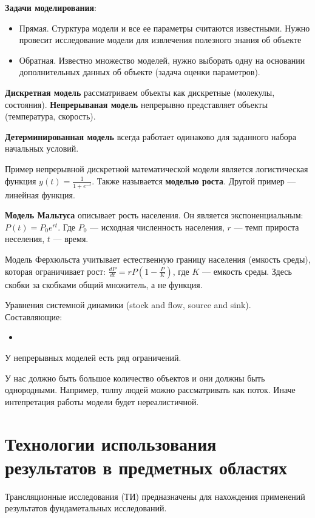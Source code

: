 \textbf{Задачи моделирования}:
\begin{itemize}
    \item Прямая. Стурктура модели и все ее параметры считаются известными.
        Нужно провесит исследование модели для извлечения полезного знания об
        объекте

    \item Обратная. Известно множество моделей, нужно выборать одну на
        основании дополнительных данных об объекте (задача оценки параметров).
\end{itemize}

\textbf{Дискретная модель} рассматриваем объекты как дискретные (молекулы, состояния).
\textbf{Непрерываная модель} непрерывно представляет объекты (температура, скорость).

\textbf{Детерминированная модель} всегда работает одинаково для заданного набора
начальных условий.

Пример непрерывной дискретной математической модели является логистическая
функция $y(t) = \frac{1}{1 + e^{-t}}$. Также называется \textbf{моделью роста}.
Другой пример --- линейная функция.

\textbf{Модель Мальтуса} описывает рость населения. Он является экспоненциальным: $P(t)
= P_0 e^{rt}$. Где $P_0$ --- исходная численность населения, $r$ --- темп
прироста неселения, $t$ --- время.

Модель Ферхюльста учитывает естественную границу населения (емкость среды), которая
ограничивает рост: $\frac{dP}{dt} = rP(1 - \frac{P}{K})$, где $K$ --- емкость
среды. Здесь скобки за скобками общий множитель, а не функция.


Уравнения системной динамики (stock and flow, source and sink). Составляющие:
\begin{itemize}
    \item 
\end{itemize}

У непрерывных моделей есть ряд ограничений.

У нас должно быть большое количество объектов и они должны быть однородными.
Например, толпу людей можно рассматривать как поток. Иначе интепретация работы
модели будет нереалистичной.

\section{Технологии использования результатов в предметных областях}

Трансляционные исследования (ТИ) предназначены для нахождения применений
результатов фундаметальных исследований.


